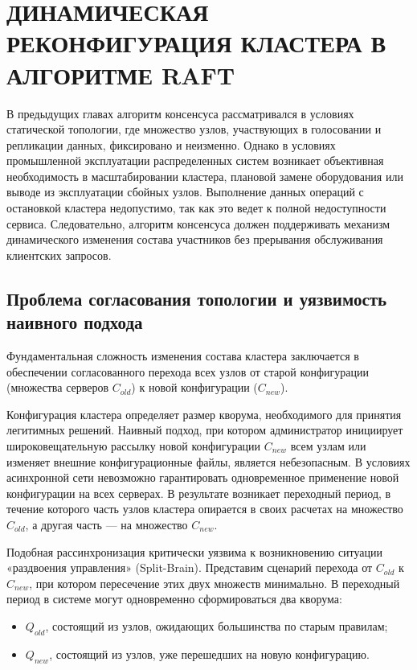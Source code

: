 \chapter{ДИНАМИЧЕСКАЯ РЕКОНФИГУРАЦИЯ КЛАСТЕРА В АЛГОРИТМЕ RAFT}
\label{ch:membership}

В предыдущих главах алгоритм консенсуса рассматривался в условиях статической топологии, где множество узлов, участвующих в голосовании и репликации данных, фиксировано и неизменно. Однако в условиях промышленной эксплуатации распределенных систем возникает объективная необходимость в масштабировании кластера, плановой замене оборудования или выводе из эксплуатации сбойных узлов. Выполнение данных операций с остановкой кластера недопустимо, так как это ведет к полной недоступности сервиса. Следовательно, алгоритм консенсуса должен поддерживать механизм динамического изменения состава участников без прерывания обслуживания клиентских запросов. 

\section{Проблема согласования топологии и уязвимость наивного подхода}
\label{sec:mem-naive}

Фундаментальная сложность изменения состава кластера заключается в обеспечении согласованного перехода всех узлов от старой конфигурации (множества серверов $C_{old}$) к новой конфигурации ($C_{new}$). 

Конфигурация кластера определяет размер кворума, необходимого для принятия легитимных решений. Наивный подход, при котором администратор инициирует широковещательную рассылку новой конфигурации $C_{new}$ всем узлам или изменяет внешние конфигурационные файлы, является небезопасным. В условиях асинхронной сети невозможно гарантировать одновременное применение новой конфигурации на всех серверах. В результате возникает переходный период, в течение которого часть узлов кластера опирается в своих расчетах на множество $C_{old}$, а другая часть — на множество $C_{new}$.

Подобная рассинхронизация критически уязвима к возникновению ситуации «раздвоения управления» (Split-Brain). Представим сценарий перехода от $C_{old}$ к $C_{new}$, при котором пересечение этих двух множеств минимально. В переходный период в системе могут одновременно сформироваться два кворума:
\begin{itemize}
    \item $Q_{old}$, состоящий из узлов, ожидающих большинства по старым правилам;
    \item $Q_{new}$, состоящий из узлов, уже перешедших на новую конфигурацию.
\end{itemize}

